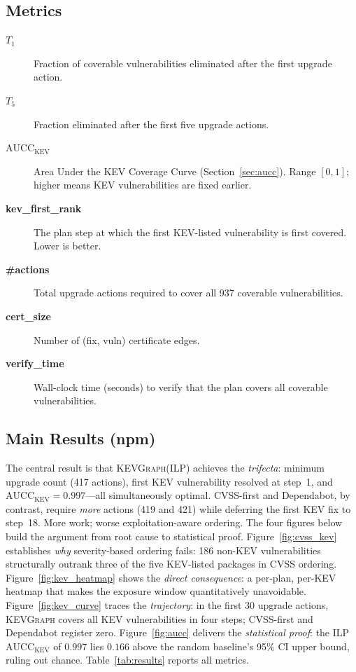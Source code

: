 \documentclass[conference]{IEEEtran}
\newcommand{\kevgraph}{\textsc{KEVGraph}\xspace}
\newcommand{\aucc}{$\mathrm{AUCC}_{\mathrm{KEV}}$\xspace}
\newcommand{\Tone}{$T_1$\xspace}
\newcommand{\Tfive}{$T_5$\xspace}
\begin{document}
\subsection{Metrics}

\begin{description}
  \item[\Tone] Fraction of coverable vulnerabilities eliminated after
        the first upgrade action.
  \item[\Tfive] Fraction eliminated after the first five upgrade actions.
  \item[\aucc] Area Under the KEV Coverage Curve (Section~\ref{sec:aucc}).
        Range $[0,1]$; higher means KEV vulnerabilities are fixed earlier.
  \item[\textbf{kev\_first\_rank}] The plan step at which the first
        KEV-listed vulnerability is first covered.  Lower is better.
  \item[\textbf{\#actions}] Total upgrade actions required to cover all 937 coverable vulnerabilities.
  \item[\textbf{cert\_size}] Number of (fix, vuln) certificate edges.
  \item[\textbf{verify\_time}] Wall-clock time (seconds) to verify that
        the plan covers all coverable vulnerabilities.
\end{description}

\subsection{Main Results (npm)}

The central result is that \kevgraph (ILP) achieves the
\emph{trifecta}: minimum upgrade count (417 actions), first KEV
vulnerability resolved at step~1, and \aucc $= 0.997$---all simultaneously
optimal.  CVSS-first and Dependabot, by contrast, require \emph{more}
actions (419 and 421) while deferring the first KEV fix to step~18.  More
work; worse exploitation-aware ordering.  The four figures below build
the argument from root cause to statistical proof.
Figure~\ref{fig:cvss_kev} establishes \emph{why} severity-based ordering
fails: 186 non-KEV vulnerabilities structurally outrank three of the five
KEV-listed packages in CVSS ordering.
Figure~\ref{fig:kev_heatmap} shows the \emph{direct consequence}: a
per-plan, per-KEV heatmap that makes the exposure window quantitatively
unavoidable.
Figure~\ref{fig:kev_curve} traces the \emph{trajectory}: in the first 30
upgrade actions, \kevgraph covers all KEV vulnerabilities in four steps;
CVSS-first and Dependabot register zero.
Figure~\ref{fig:aucc} delivers the \emph{statistical proof}: the ILP
\aucc of $0.997$ lies $0.166$ above the random baseline's 95\% CI upper
bound, ruling out chance.
Table~\ref{tab:results} reports all metrics.
\end{document}

